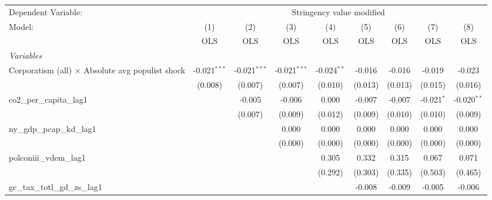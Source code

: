
\begingroup
\centering
\begin{tabular}{lcccccccc}
   \toprule
   Dependent Variable: & \multicolumn{8}{c}{Stringency value modified}\\
   Model:                                                  & (1)            & (2)            & (3)            & (4)           & (5)     & (6)     & (7)          & (8)\\  
                                                           &  OLS           & OLS            & OLS            & OLS           & OLS     & OLS     & OLS          & OLS\\  
   \midrule
   \emph{Variables}\\
   Corporatism (all) $\times$ Absolute avg populist shock  & -0.021$^{***}$ & -0.021$^{***}$ & -0.021$^{***}$ & -0.024$^{**}$ & -0.016  & -0.016  & -0.019       & -0.023\\   
                                                           & (0.008)        & (0.007)        & (0.007)        & (0.010)       & (0.013) & (0.013) & (0.015)      & (0.016)\\   
   co2\_per\_capita\_lag1                                  &                & -0.005         & -0.006         & 0.000         & -0.007  & -0.007  & -0.021$^{*}$ & -0.020$^{**}$\\   
                                                           &                & (0.007)        & (0.009)        & (0.012)       & (0.009) & (0.010) & (0.010)      & (0.009)\\   
   ny\_gdp\_pcap\_kd\_lag1                                 &                &                & 0.000          & 0.000         & 0.000   & 0.000   & 0.000        & 0.000\\   
                                                           &                &                & (0.000)        & (0.000)       & (0.000) & (0.000) & (0.000)      & (0.000)\\   
   polconiii\_vdem\_lag1                                   &                &                &                & 0.305         & 0.332   & 0.315   & 0.067        & 0.071\\   
                                                           &                &                &                & (0.292)       & (0.303) & (0.335) & (0.503)      & (0.465)\\   
   gc\_tax\_totl\_gd\_zs\_lag1                             &                &                &                &               & -0.008  & -0.009  & -0.005       & -0.006\\   

\end{tabular}
